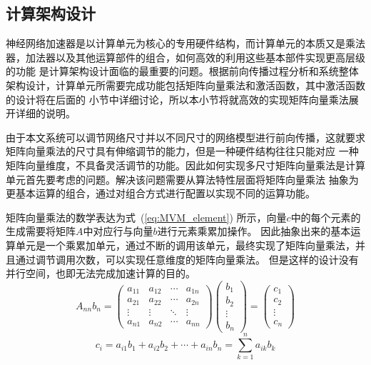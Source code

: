 \subsection{计算架构设计}
神经网络加速器是以计算单元为核心的专用硬件结构，而计算单元的本质又是乘法器，加法器以及其他运算部件的组合，如何高效的利用这些基本部件实现更高层级的功能
是计算架构设计面临的最重要的问题。根据前向传播过程分析和系统整体架构设计，计算单元所需要完成功能包括矩阵向量乘法和激活函数，其中激活函数的设计将在后面的
小节中详细讨论，所以本小节将就高效的实现矩阵向量乘法展开详细的说明。

由于本文系统可以调节网络尺寸并以不同尺寸的网络模型进行前向传播，这就要求矩阵向量乘法的尺寸具有伸缩调节的能力，但是一种硬件结构往往只能对应
一种矩阵向量维度，不具备灵活调节的功能。因此如何实现多尺寸矩阵向量乘法是计算单元首先要考虑的问题。解决该问题需要从算法特性层面将矩阵向量乘法
抽象为更基本运算的组合，通过对组合方式进行配置以实现不同的运算功能。

矩阵向量乘法的数学表达为式~(\ref{eq:MVM_element}) 所示，向量\(c\)中的每个元素的生成需要将矩阵\(A\)中对应行与向量\(b\)进行元素乘累加操作。
因此抽象出来的基本运算单元是一个乘累加单元，通过不断的调用该单元，最终实现了矩阵向量乘法，并且通过调节调用次数，可以实现任意维度的矩阵向量乘法。
但是这样的设计没有并行空间，也即无法完成加速计算的目的。
\begin{equation}
	A_{nn}b_n = 
	\begin{pmatrix}
		a_{11} & a_{12} & \cdots & a_{1n} \\
  		a_{21} & a_{22} & \cdots & a_{2n} \\
  		\vdots  & \vdots  & \ddots & \vdots  \\
  		a_{n1} & a_{n2} & \cdots & a_{nn} 
 \end{pmatrix}
	\begin{pmatrix}
        b_{1}	\\ 
        b_{2}	\\
		\vdots	\\ 
        b_{n} 
	\end{pmatrix}
  =
	\begin{pmatrix}
        c_{1}	\\ 
        c_{2}	\\
		\vdots	\\ 
        c_{n}  
     \end{pmatrix}
\label{eq:MVM_element}
\end{equation}
$$c_{i}= a_{i1} b_{1} + a_{i2} b_{2} +\cdots+ a_{in}b_{n} = \sum_{k=1}^n a_{ik}b_{k}$$

